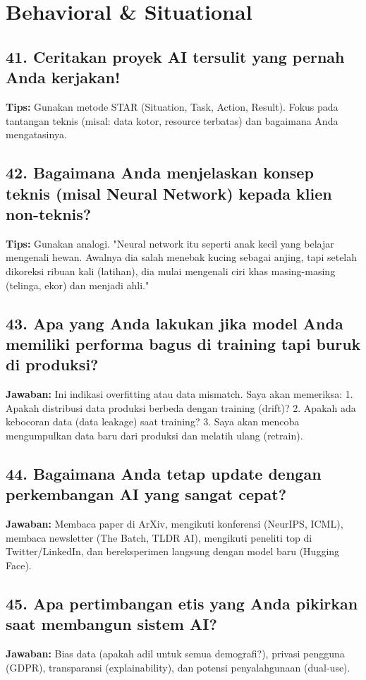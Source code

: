\section{Behavioral \& Situational}

\subsection{41. Ceritakan proyek AI tersulit yang pernah Anda kerjakan!}
\textbf{Tips:} Gunakan metode STAR (Situation, Task, Action, Result). Fokus pada tantangan teknis (misal: data kotor, resource terbatas) dan bagaimana Anda mengatasinya.

\subsection{42. Bagaimana Anda menjelaskan konsep teknis (misal Neural Network) kepada klien non-teknis?}
\textbf{Tips:} Gunakan analogi. "Neural network itu seperti anak kecil yang belajar mengenali hewan. Awalnya dia salah menebak kucing sebagai anjing, tapi setelah dikoreksi ribuan kali (latihan), dia mulai mengenali ciri khas masing-masing (telinga, ekor) dan menjadi ahli."

\subsection{43. Apa yang Anda lakukan jika model Anda memiliki performa bagus di training tapi buruk di produksi?}
\textbf{Jawaban:}
Ini indikasi overfitting atau data mismatch. Saya akan memeriksa:
1. Apakah distribusi data produksi berbeda dengan training (drift)?
2. Apakah ada kebocoran data (data leakage) saat training?
3. Saya akan mencoba mengumpulkan data baru dari produksi dan melatih ulang (retrain).

\subsection{44. Bagaimana Anda tetap update dengan perkembangan AI yang sangat cepat?}
\textbf{Jawaban:}
Membaca paper di ArXiv, mengikuti konferensi (NeurIPS, ICML), membaca newsletter (The Batch, TLDR AI), mengikuti peneliti top di Twitter/LinkedIn, dan bereksperimen langsung dengan model baru (Hugging Face).

\subsection{45. Apa pertimbangan etis yang Anda pikirkan saat membangun sistem AI?}
\textbf{Jawaban:}
Bias data (apakah adil untuk semua demografi?), privasi pengguna (GDPR), transparansi (explainability), dan potensi penyalahgunaan (dual-use).

